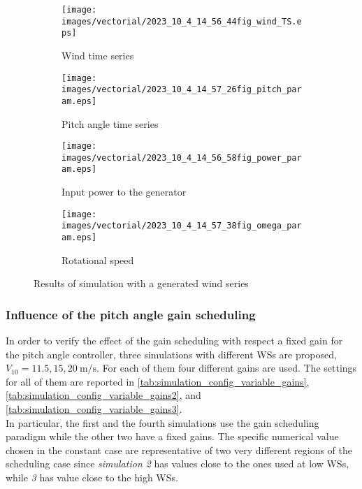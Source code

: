 \begin{figure}[!htbp]
  \begin{subfigure}{0.49\columnwidth}
    \centering
    \texttt{[image: images/vectorial/2023\_10\_4\_14\_56\_44fig\_wind\_TS.eps]}
    \caption{Wind time series}
    \label{fig:2023_05_1_00_55_48fig_wind_TS}
  \end{subfigure}
  \begin{subfigure}{0.49\columnwidth}
    \centering
    \texttt{[image: images/vectorial/2023\_10\_4\_14\_57\_26fig\_pitch\_param.eps]}
    \caption{Pitch angle time series}
    \label{fig:2023_05_1_00_50_19fig_power_param}
  \end{subfigure}
  \begin{subfigure}{0.49\columnwidth}
    \centering
    \texttt{[image: images/vectorial/2023\_10\_4\_14\_56\_58fig\_power\_param.eps]}
    \caption{Input power to the generator}
    \label{fig:2023_05_1_00_51_17fig_omega_param}
  \end{subfigure}
  \begin{subfigure}{0.49\columnwidth}
    \centering
    \texttt{[image: images/vectorial/2023\_10\_4\_14\_57\_38fig\_omega\_param.eps]}
    \caption{Rotational speed}
    \label{fig:2023_05_1_00_50_58fig_pitch_param}
  \end{subfigure}
  \caption{Results of simulation with a generated wind series}
  \label{fig:simulation_rand_wind_NPC}
\end{figure}

\subsubsection{Influence of the pitch angle gain scheduling}\label{subsec:gain_scheduling_disabling}
In order to verify the effect of the gain scheduling with respect a fixed gain for the pitch angle controller, three simulations with different WSs are proposed, $V_{10} = 11.5, 15, 20 \ \si{\meter\per\second}$. For each of them four different gains are used. The settings for all of them are reported in \autoref{tab:simulation_config_variable_gains}, \autoref{tab:simulation_config_variable_gains2}, and \autoref{tab:simulation_config_variable_gains3}. \\
In particular, the first and the fourth simulations use the gain scheduling paradigm while the other two have a fixed gains. The specific numerical value chosen in the constant case are representative of two very different regions of the scheduling case since \textit{simulation 2} has values close to the ones used at low WSs, while \textit{3} has value close to the high WSs. 

